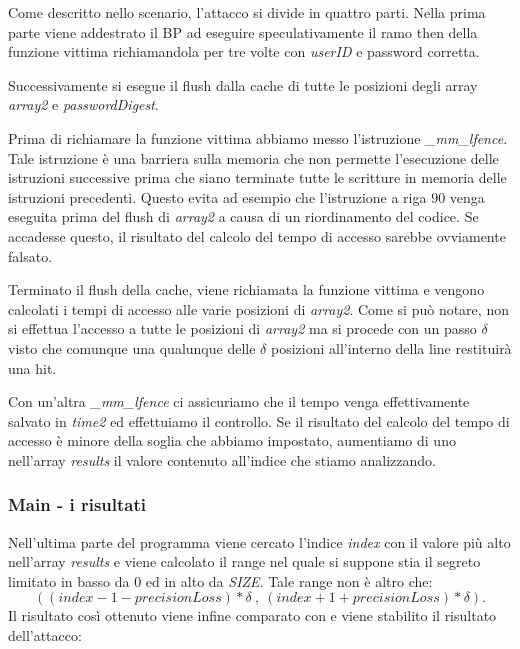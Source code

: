 				Come descritto nello scenario, l'attacco si divide in quattro parti. Nella prima parte viene addestrato il \ac{BP} ad eseguire speculativamente il ramo then della funzione vittima richiamandola per tre volte con \emph{userID} e password corretta.
				
				Successivamente si esegue il flush dalla cache di tutte le posizioni degli array \emph{array2} e \emph{passwordDigest}.
				
				Prima di richiamare la funzione vittima abbiamo messo l'istruzione \emph{\_mm\_lfence}. Tale istruzione è una barriera sulla memoria che non permette l'esecuzione delle istruzioni successive prima che siano terminate tutte le scritture in memoria delle istruzioni precedenti. Questo evita ad esempio che l'istruzione a riga $90$ venga eseguita prima del flush di \emph{array2} a causa di un riordinamento del codice. Se accadesse questo, il risultato del calcolo del tempo di accesso sarebbe ovviamente falsato.
				
				Terminato il flush della cache, viene richiamata la funzione vittima e vengono calcolati i tempi di accesso alle varie posizioni di \emph{array2}. Come si può notare, non si effettua l'accesso a tutte le posizioni di \emph{array2} ma si procede con un passo $\delta$ visto che comunque una qualunque delle $\delta$ posizioni all'interno della line restituirà una hit.
				
				Con un'altra \emph{\_mm\_lfence} ci assicuriamo che il tempo venga effettivamente salvato in \emph{time2} ed effettuiamo il controllo. Se il risultato del calcolo del tempo di accesso è minore della soglia che abbiamo impostato, aumentiamo di uno nell'array \emph{results} il valore  contenuto all'indice che stiamo analizzando.
				
				\subsubsection{Main - i risultati}
				
				Nell'ultima parte del programma viene cercato l'indice \emph{index} con il valore più alto nell'array \emph{results} e viene calcolato il range nel quale si suppone stia il segreto limitato in basso da $0$ ed in alto da \emph{SIZE}. Tale range non è altro che: $$((index - 1 - precisionLoss) * \delta\ ,\ (index + 1 + precisionLoss) * \delta).$$ Il risultato così ottenuto viene infine comparato con  e viene stabilito il risultato dell'attacco:
				
